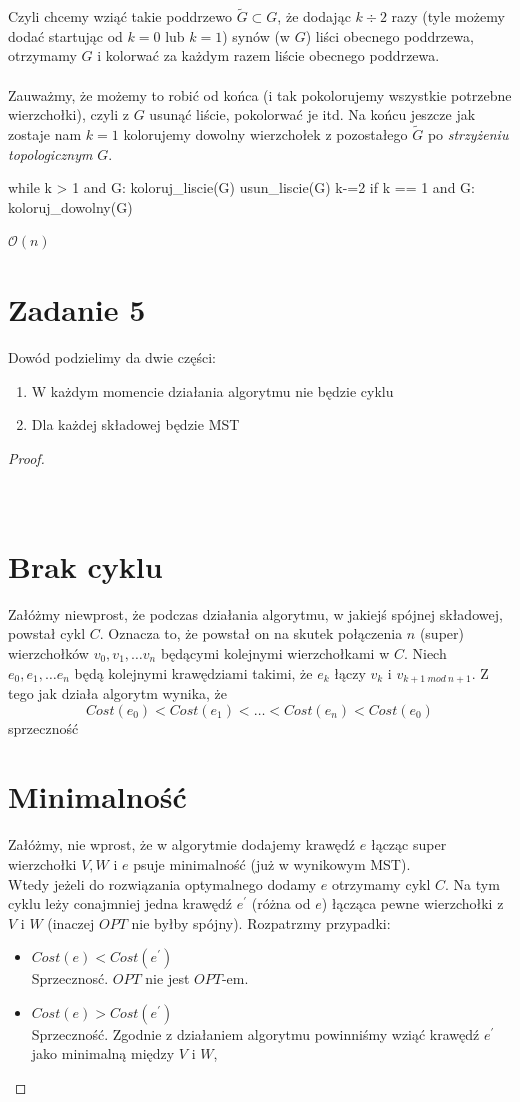 \documentclass{article}
\begin{document}
Czyli chcemy wziąć takie poddrzewo $\widetilde{G} \subset G$, że dodając $k \div 2$ razy (tyle możemy dodać startując od $k=0$ lub $k=1$) synów (w $G$) liści obecnego poddrzewa, otrzymamy $G$ i kolorwać za każdym razem liście obecnego poddrzewa.\\\\
Zauważmy, że możemy to robić od końca (i tak pokolorujemy wszystkie potrzebne wierzchołki), czyli z $G$ usunąć liście, pokolorwać je itd. Na końcu jeszcze jak zostaje nam $k = 1$ kolorujemy dowolny wierzchołek z pozostałego $\widetilde{G}$ po \textit{strzyżeniu topologicznym} $G$.
\begin{python}
while k > 1 and G:
    koloruj_liscie(G)
    usun_liscie(G)
    k-=2
if k == 1 and G:
    koloruj_dowolny(G)
\end{python}
$\mathcal{O}(n)$
\clearpage
\section{Zadanie 5}
Dowód podzielimy da dwie części:
\begin{enumerate}
    \item W każdym momencie działania algorytmu nie będzie cyklu
    \item Dla każdej składowej będzie MST
\end{enumerate}
\begin{proof}
\section*{\\Brak cyklu}
Załóżmy niewprost, że podczas działania  algorytmu, w jakiejś  spójnej składowej,  powstał cykl $C$. Oznacza to, że powstał on na skutek połączenia $n$ (super) wierzchołków $v_0, v_1, \dots v_n$ będącymi kolejnymi wierzchołkami w $C$. Niech $e_0, e_1, \dots  e_n$ będą kolejnymi krawędziami takimi, że $e_k$ łączy $v_k$ i $v_{k+1\ mod\ n+1}$. Z tego jak działa algorytm wynika, że 
$$Cost(e_0) < Cost(e_1) < \ldots < Cost(e_n) < Cost(e_0)$$ sprzeczność
\section*{Minimalność}
Załóżmy, nie wprost, że w algorytmie dodajemy krawędź $e$ łącząc super wierzchołki $V, W$ i $e$ psuje minimalność (już w wynikowym MST).\\
Wtedy jeżeli do rozwiązania optymalnego dodamy $e$ otrzymamy cykl $C$. Na tym cyklu leży conajmniej jedna krawędź $e^\prime$ (różna od $e$) łącząca pewne wierzchołki z $V$ i $W$ (inaczej $OPT$ nie byłby spójny). Rozpatrzmy przypadki:
\begin{itemize}
    \item $Cost(e) < Cost(e^\prime)$ \\ Sprzecznosć. $OPT$ nie jest $OPT$-em.
    \item $Cost(e) > Cost(e^\prime)$ \\ Sprzeczność. Zgodnie z działaniem algorytmu powinniśmy wziąć krawędź $e^\prime$ jako minimalną między $V$ i $W$,
\end{itemize}
\end{proof}
\clearpage
\setcounter{lemma}{0}
\end{document}
